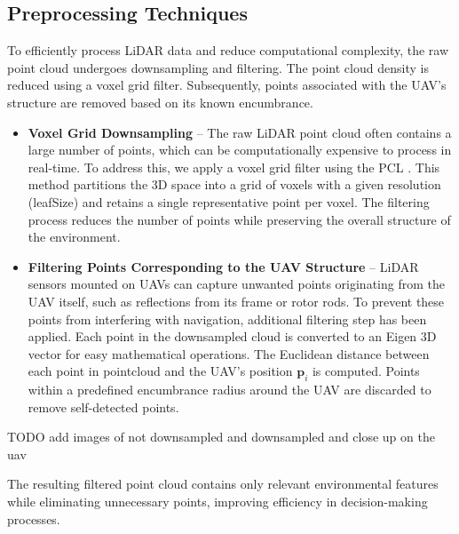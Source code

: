         \subsection{Preprocessing Techniques}
            To efficiently process \ac{LiDAR} data and reduce computational complexity, the raw point cloud undergoes downsampling and filtering. 
            The point cloud density is reduced using a voxel grid filter. 
            Subsequently, points associated with the \ac{UAV}'s structure are removed based on its known encumbrance.
            \begin{itemize}
                \item \textbf{Voxel Grid Downsampling} -- The raw \ac{LiDAR} point cloud often contains a large number of points, which can be computationally expensive to process in real-time. 
                To address this, we apply a voxel grid filter using the \ac{PCL} \cite{pcl_voxelgrid}. 
                This method partitions the 3D space into a grid of voxels with a given resolution (leafSize) and retains a single representative point per voxel. 
                The filtering process reduces the number of points while preserving the overall structure of the environment.
                \item \textbf{Filtering Points Corresponding to the UAV Structure} -- \ac{LiDAR} sensors mounted on \ac{UAV}s can capture unwanted points originating from the \ac{UAV} itself, such as reflections from its frame or rotor rods. 
                To prevent these points from interfering with navigation, additional filtering step has been applied.
                Each point in the downsampled cloud is converted to an Eigen 3D vector for easy mathematical operations. 
                The Euclidean distance between each point in pointcloud and the \ac{UAV}'s position \(\mathbf{p}_i\) is computed. 
                Points within a predefined encumbrance radius around the \ac{UAV} are discarded to remove self-detected points. 
            \end{itemize}
            TODO add images of not downsampled and downsampled and close up on the uav

            The resulting filtered point cloud contains only relevant environmental features while eliminating unnecessary points, improving efficiency in decision-making processes.

